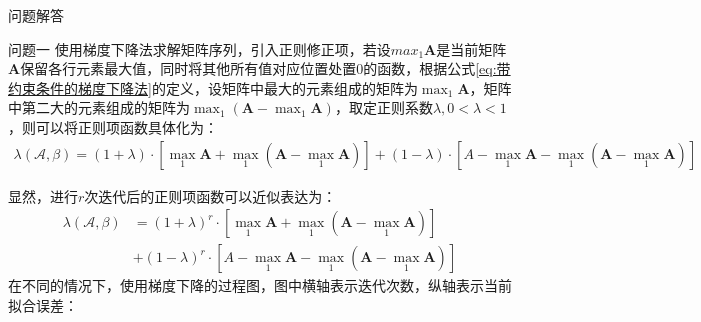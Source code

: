 \documentclass[11pt]{article}
\begin{document}
\begin{section}{问题解答}
 \begin{subsection}{问题一}
   使用梯度下降法求解矩阵序列，引入正则修正项，若设$max_1{\mathbf{A}}$是当前矩阵$\mathbf{A}$保留各行元素最大值，同时将其他所有值对应位置处置0的函数，根据公式\ref{eq:带约束条件的梯度下降法}的定义，设矩阵中最大的元素组成的矩阵为$\max_1{\mathbf{A}}$，矩阵中第二大的元素组成的矩阵为$\max_1(\mathbf{A}-\max_1\mathbf{A})$，取定正则系数$\lambda,0<\lambda<1$，则可以将正则项函数具体化为：
   \begin{align}
     \lambda(\mathcal{A},\beta)=(1+\lambda)\cdot[\max_1{\mathbf{A}}+\max_1(\mathbf{A}-\max_1\mathbf{A})]+(1-\lambda)\cdot[A-\max_1{\mathbf{A}}-\max_1(\mathbf{A}-\max_1\mathbf{A})]
     \label{eq:正则项函数定义式}
   \end{align}
   \par
   显然，进行$r$次迭代后的正则项函数可以近似表达为：
   \begin{align}
     \lambda(\mathcal{A},\beta) & =(1+\lambda)^r\cdot[\max_1{\mathbf{A}}+\max_1(\mathbf{A}-\max_1\mathbf{A})]        \\
                                & +     (1-\lambda)^r\cdot[A-\max_1{\mathbf{A}}-\max_1(\mathbf{A}-\max_1\mathbf{A})]
     \label{eq:正则项函数多次迭代结果}
   \end{align}
   在不同的情况下，使用梯度下降的过程图，图中横轴表示迭代次数，纵轴表示当前拟合误差：
   \begin{figure}[H]
     \centering

\end{figure}
\end{subsection}
\end{section}
\end{document}
